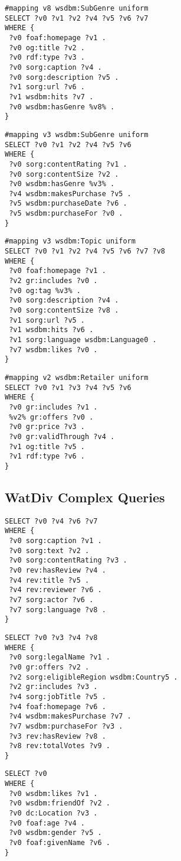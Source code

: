 \begin{lstlisting}[caption={F2},label=query:F2]
#mapping v8 wsdbm:SubGenre uniform
SELECT ?v0 ?v1 ?v2 ?v4 ?v5 ?v6 ?v7
WHERE {
 ?v0 foaf:homepage ?v1 .
 ?v0 og:title ?v2 .
 ?v0 rdf:type ?v3 .
 ?v0 sorg:caption ?v4 .
 ?v0 sorg:description ?v5 .
 ?v1 sorg:url ?v6 .
 ?v1 wsdbm:hits ?v7 .
 ?v0 wsdbm:hasGenre %v8% .
}
\end{lstlisting}

\begin{lstlisting}[caption={F3},label=query:F3]
#mapping v3 wsdbm:SubGenre uniform
SELECT ?v0 ?v1 ?v2 ?v4 ?v5 ?v6
WHERE {
 ?v0 sorg:contentRating ?v1 .
 ?v0 sorg:contentSize ?v2 .
 ?v0 wsdbm:hasGenre %v3% .
 ?v4 wsdbm:makesPurchase ?v5 .
 ?v5 wsdbm:purchaseDate ?v6 .
 ?v5 wsdbm:purchaseFor ?v0 .
}
\end{lstlisting}

\begin{lstlisting}[caption={F4},label=query:F4]
#mapping v3 wsdbm:Topic uniform
SELECT ?v0 ?v1 ?v2 ?v4 ?v5 ?v6 ?v7 ?v8
WHERE {
 ?v0 foaf:homepage ?v1 .
 ?v2 gr:includes ?v0 .
 ?v0 og:tag %v3% .
 ?v0 sorg:description ?v4 .
 ?v0 sorg:contentSize ?v8 .
 ?v1 sorg:url ?v5 .
 ?v1 wsdbm:hits ?v6 .
 ?v1 sorg:language wsdbm:Language0 .
 ?v7 wsdbm:likes ?v0 .
}
\end{lstlisting}

\begin{lstlisting}[caption={F5},label=query:F5]
#mapping v2 wsdbm:Retailer uniform
SELECT ?v0 ?v1 ?v3 ?v4 ?v5 ?v6
WHERE {
 ?v0 gr:includes ?v1 .
 %v2% gr:offers ?v0 .
 ?v0 gr:price ?v3 .
 ?v0 gr:validThrough ?v4 .
 ?v1 og:title ?v5 .
 ?v1 rdf:type ?v6 .
}

\end{lstlisting}

\subsection{WatDiv Complex Queries}
\label{queries:watdivbasic:complex}

\begin{lstlisting}[caption={C1},label=query:C1]
SELECT ?v0 ?v4 ?v6 ?v7
WHERE {
 ?v0 sorg:caption ?v1 .
 ?v0 sorg:text ?v2 .
 ?v0 sorg:contentRating ?v3 .
 ?v0 rev:hasReview ?v4 .
 ?v4 rev:title ?v5 .
 ?v4 rev:reviewer ?v6 .
 ?v7 sorg:actor ?v6 .
 ?v7 sorg:language ?v8 .
}
\end{lstlisting}

\begin{lstlisting}[caption={C2},label=query:C2]
SELECT ?v0 ?v3 ?v4 ?v8
WHERE {
 ?v0 sorg:legalName ?v1 .
 ?v0 gr:offers ?v2 .
 ?v2 sorg:eligibleRegion wsdbm:Country5 .
 ?v2 gr:includes ?v3 .
 ?v4 sorg:jobTitle ?v5 .
 ?v4 foaf:homepage ?v6 .
 ?v4 wsdbm:makesPurchase ?v7 .
 ?v7 wsdbm:purchaseFor ?v3 .
 ?v3 rev:hasReview ?v8 .
 ?v8 rev:totalVotes ?v9 .
}
\end{lstlisting}

\begin{lstlisting}[caption={C3},label=query:C3]
SELECT ?v0
WHERE {
 ?v0 wsdbm:likes ?v1 .
 ?v0 wsdbm:friendOf ?v2 .
 ?v0 dc:Location ?v3 .
 ?v0 foaf:age ?v4 .
 ?v0 wsdbm:gender ?v5 .
 ?v0 foaf:givenName ?v6 .
}
\end{lstlisting}
